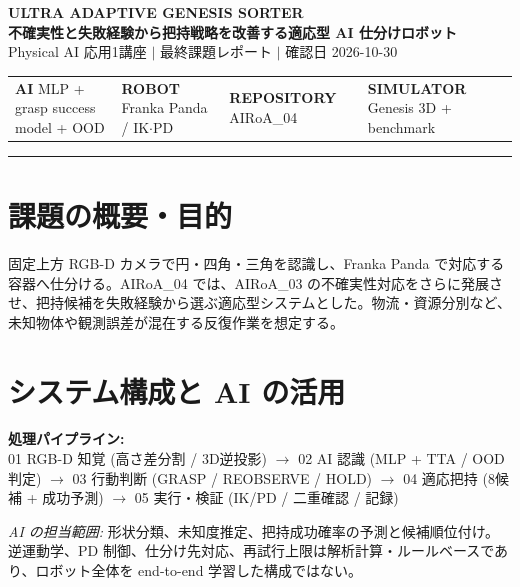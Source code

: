 \documentclass[11pt, a4paper]{article}
\begin{document}
\begin{center}
    {\fontsize{18pt}{22pt}\selectfont \textbf{\color{primary} ULTRA ADAPTIVE GENESIS SORTER}} \\[4pt]
    {\large \textbf{不確実性と失敗経験から把持戦略を改善する適応型 AI 仕分けロボット}} \\[4pt]
    {\small \color{subtext} Physical AI 応用1講座 $|$ 最終課題レポート $|$ 確認日 2026-10-30}
\end{center}

\vspace{2mm}

\noindent
\begin{tabularx}{\textwidth}{@{} X X X X @{}}
\textbf{AI} MLP + grasp success model + OOD &
\textbf{ROBOT} Franka Panda / IK$\cdot$PD &
\textbf{REPOSITORY} AIRoA\_04 &
\textbf{SIMULATOR} Genesis 3D + benchmark \\
\end{tabularx}

\vspace{2mm}
\hrule
\vspace{4mm}

\section{課題の概要・目的}
固定上方 RGB-D カメラで円・四角・三角を認識し、Franka Panda で対応する容器へ仕分ける。AIRoA\_04 では、AIRoA\_03 の不確実性対応をさらに発展させ、把持候補を失敗経験から選ぶ適応型システムとした。物流・資源分別など、未知物体や観測誤差が混在する反復作業を想定する。

\vspace{3mm}

\section{システム構成と AI の活用}

\textbf{処理パイプライン:} \\
01 RGB-D 知覚 (高さ差分割 / 3D逆投影) $\rightarrow$
02 AI 認識 (MLP + TTA / OOD 判定) $\rightarrow$
03 行動判断 (GRASP / REOBSERVE / HOLD) $\rightarrow$
04 適応把持 (8候補 + 成功予測) $\rightarrow$
05 実行・検証 (IK/PD / 二重確認 / 記録)

\vspace{2mm}
\noindent
\textit{AI の担当範囲:} 形状分類、未知度推定、把持成功確率の予測と候補順位付け。逆運動学、PD 制御、仕分け先対応、再試行上限は解析計算・ルールベースであり、ロボット全体を end-to-end 学習した構成ではない。
\end{document}
